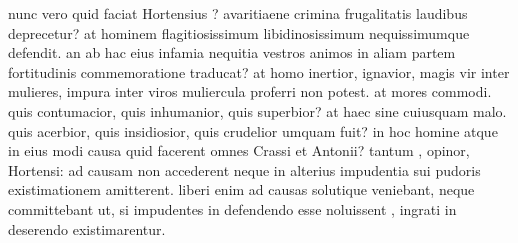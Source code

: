  nunc vero quid faciat Hortensius ? avaritiaene crimina frugalitatis laudibus deprecetur? at hominem flagitiosissimum libidinosissimum nequissimumque defendit. an ab hac eius infamia nequitia vestros animos in aliam partem fortitudinis commemoratione traducat? at homo inertior, ignavior, magis vir inter mulieres, impura inter viros muliercula proferri non potest. at mores commodi. quis contumacior, quis inhumanior, quis superbior? at haec sine cuiusquam malo. quis acerbior, quis insidiosior, quis crudelior umquam fuit? in hoc homine atque in eius modi causa quid facerent omnes Crassi et Antonii? tantum , opinor, Hortensi: ad causam non accederent neque in alterius impudentia sui pudoris existimationem amitterent. liberi enim ad causas solutique veniebant, neque committebant ut, si impudentes in defendendo esse noluissent , ingrati in deserendo existimarentur.
